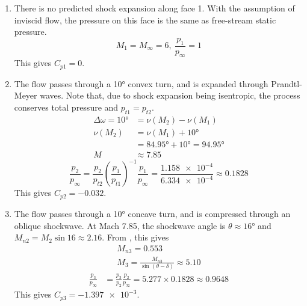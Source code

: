 \documentclass[a4paper]{article}
\begin{document}
\begin{enumerate}[label=\arabic*)]
	\item There is no predicted shock expansion along face 1. With the assumption of inviscid flow, the pressure on this face is the same as free-stream static pressure.
	\begin{equation*}
		M_1 = M_\infty = 6,\
		\frac{p_1}{p_\infty} = 1
	\end{equation*}
	This gives \(C_{p1} = 0\).

	\item The flow passes through a \ang{10} convex turn, and is expanded through Prandtl-Meyer waves. Note that, due to shock expansion being isentropic, the process conserves total pressure and \(p_{t1} = p_{t2}\).
	\begin{align*}
		\Delta \omega = \ang{10} &= \nu(M_2) - \nu(M_1) \\
		\nu(M_2) &= \nu(M_1) + \ang{10} \\
		&= \ang{84.95} + \ang{10} = \ang{94.95} \\
		M &\approx 7.85
	\end{align*}
	\begin{equation*}
		\frac{p_2}{p_\infty} = \frac{p_2}{p_{t2}} \left( \frac{p_1}{p_{t1}} \right)^{-1} \frac{p_1}{p_\infty}
		= \frac{\num{1.158e-4}}{\num{6.334e-4}} \approx 0.1828
	\end{equation*}
	This gives \(C_{p2} = -0.032\).

	\item The flow passes through a \ang{10} concave turn, and is compressed through an oblique shockwave. At Mach 7.85, the shockwave angle is \(\theta \approx \ang{16}\) and \(M_{n2} = M_2 \sin{16} \approx 2.16\). From \cite{NASATables}, this gives
	\begin{gather*}
		M_{n3} = 0.553 \\
		M_3 = \frac{M_{n3}}{\sin(\theta - \delta)} \approx 5.10
	\end{gather*}
	\begin{align*}
		\frac{p_3}{p_\infty} &= \frac{p_3}{p_2} \frac{p_2}{p_\infty} = 5.277 \times 0.1828 \approx 0.9648
	\end{align*}
	This gives \(C_{p3} = \num{-1.397e-3}\).
\end{enumerate}
\end{document}
